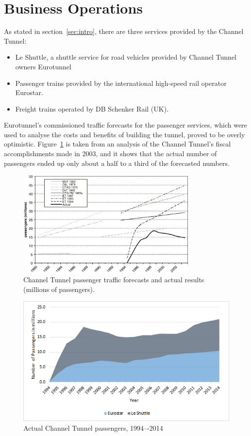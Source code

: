 \documentclass[12pt]{article} %
\begin{document}
\section{Business Operations}
\label{sec:op}

As stated in section~\ref{sec:intro}, there are three services provided by the Channel Tunnel:
\begin{itemize}
	\item Le Shuttle, a shuttle service for road vehicles provided by Channel Tunnel owners Eurotunnel
	\item Passenger trains provided by the international high-speed rail operator Eurostar.\cite{eurostar}
	\item Freight trains operated by DB Schenker Rail (UK).\cite{db-sche}
\end{itemize}

Eurotunnel's commissioned traffic forecasts for the passenger services, which were used to analyse the costs and benefits of building the tunnel, proved to be overly optimistic. Figure~\ref{fig:pass-fore} is taken from an analysis of the Channel Tunnel's fiscal accomplishments made in 2003\cite{costeval}, and it shows that the actual number of passengers ended up only about a half to a third of the forecasted numbers.

\begin{figure}[hp]
  \centering
  \includegraphics[width=0.8\textwidth]{pass}
  \caption{Channel Tunnel passenger traffic forecasts and actual results (millions of passengers).}
  \label{fig:pass-fore}
\end{figure}

\begin{figure}[hp]
  \centering
  \includegraphics[width=\textwidth]{pass-new}
  \caption{Actual Channel Tunnel passengers, 1994–-2014}
  \label{fig:pass-new}
\end{figure}
\end{document}
